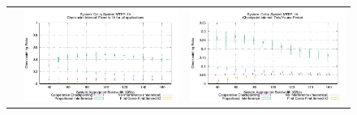 \documentclass[conference]{IEEEtran}
\begin{document}
\begin{figure}[t]
\begin{tabular}{C{.02\linewidth}C{.49\linewidth}C{.49\linewidth}}
 & \includegraphics[width=\linewidth]{sim/figures/1hMTBF-1hckpt-ckpt-celio.pdf} & \includegraphics[width=\linewidth]{sim/figures/1hMTBF-dalyckpt-ckpt-celio.pdf} \\

\end{tabular}
\end{figure}
\end{document}
